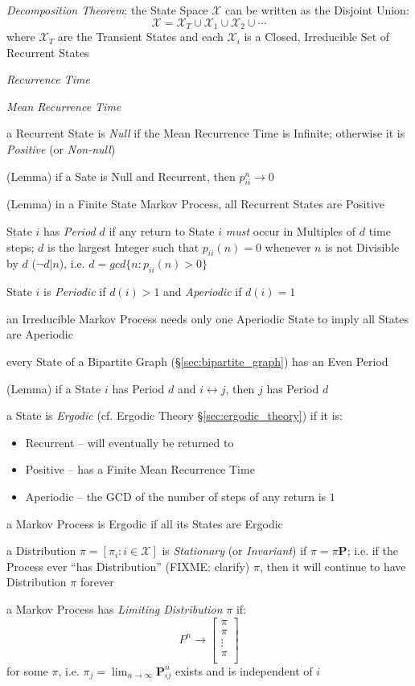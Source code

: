 \emph{Decomposition Theorem}:
the State Space $\mathcal{X}$ can be written as the Disjoint Union:
\[
  \mathcal{X} = \mathcal{X}_T \cup \mathcal{X}_1 \cup \mathcal{X}_2 \cup \cdots
\]
where $\mathcal{X}_T$ are the Transient States and each $\mathcal{X}_i$ is a
Closed, Irreducible Set of Recurrent States

\emph{Recurrence Time}

\emph{Mean Recurrence Time}

a Recurrent State is \emph{Null} if the Mean Recurrence Time is Infinite;
otherwise it is \emph{Positive} (or \emph{Non-null})

(Lemma) if a Sate is Null and Recurrent, then $p_{ii}^n \to 0$

(Lemma) in a Finite State Markov Process, all Recurrent States are Positive

State $i$ has \emph{Period} $d$ if any return to State $i$ \emph{must} occur in
Multiples of $d$ time steps; $d$ is the largest Integer such that
$p_{ii}(n) = 0$ whenever $n$ is not Divisible by $d$ ($\neg d | n$), i.e.
$d = gcd\{n : p_{ii}(n) > 0 \}$

State $i$ is \emph{Periodic} if $d(i) > 1$ and \emph{Aperiodic} if $d(i) = 1$

an Irreducible Markov Process needs only one Aperiodic State to imply all States
are Aperiodic

every State of a Bipartite Graph (\S\ref{sec:bipartite_graph}) has an Even
Period

(Lemma) if a State $i$ has Period $d$ and $i \leftrightarrow j$, then $j$ has
Period $d$

a State is \emph{Ergodic} (cf. Ergodic Theory \S\ref{sec:ergodic_theory}) if it
is:
\begin{itemize}
  \item Recurrent -- will eventually be returned to
  \item Positive -- has a Finite Mean Recurrence Time
  \item Aperiodic -- the GCD of the number of steps of any return is $1$
\end{itemize}
a Markov Process is Ergodic if all its States are Ergodic

a Distribution $\pi = [\pi_i : i \in \mathcal{X}]$ is \emph{Stationary} (or
\emph{Invariant}) if $\pi = \pi \mathbf{P}$; i.e. if the Process ever ``has
Distribution'' (FIXME: clarify) $\pi$, then it will continue to have
Distribution $\pi$ forever

a Markov Process has \emph{Limiting Distribution} $\pi$ if:
\[
  P^n \to \begin{bmatrix}
    \pi \\
    \pi \\
    \vdots \\
    \pi \\
  \end{bmatrix}
\]
for some $\pi$, i.e. $\pi_j = \lim_{n\to\infty} \mathbf{P}_{ij}^n$
exists and is independent of $i$

